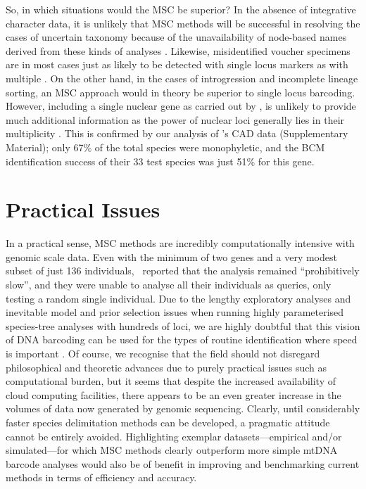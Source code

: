 \documentclass[12pt]{article}
\begin{document}
So, in which situations would the MSC be superior? In the absence of integrative character data, it is unlikely that MSC methods will be successful in resolving the cases of uncertain taxonomy because of the unavailability of node-based names derived from these kinds of analyses \citep{Bauer2010}. Likewise, misidentified voucher specimens are in most cases just as likely to be detected with single locus markers as with multiple \citep{Becker2011,Ko2013}. On the other hand, in the cases of introgression and incomplete lineage sorting, an MSC approach would in theory be superior to single locus barcoding. However, including a single nuclear gene as carried out by \citeauthor{Dowton2014}, is unlikely to provide much additional information as the power of nuclear loci generally lies in their multiplicity \citep{Edwards2009}. This is confirmed by our analysis of \citeauthor{Dowton2014}'s CAD data (Supplementary Material); only 67\% of the total species were monophyletic, and the BCM identification success of their 33 test species was just 51\% for this gene. 

\section*{Practical Issues}

In a practical sense, MSC methods are incredibly computationally intensive with genomic scale data. Even with the minimum of two genes and a very modest subset of just 136 individuals, \citeauthor{Dowton2014}\ reported that the analysis remained ``prohibitively slow'', and they were unable to analyse all their individuals as queries, only testing a random single individual. Due to the lengthy exploratory analyses and inevitable model and prior selection issues when running highly parameterised species-tree analyses with hundreds of loci, we are highly doubtful that this vision of DNA barcoding can be used for the types of routine identification where speed is important \citep{Armstrong2005}. Of course, we recognise that the field should not disregard philosophical and theoretic advances due to purely practical issues such as computational burden, but it seems that despite the increased availability of cloud computing facilities, there appears to be an even greater increase in the volumes of data now generated by genomic sequencing. Clearly, until considerably faster species delimitation methods can be developed, a pragmatic attitude cannot be entirely avoided.  Highlighting exemplar datasets---empirical and/or simulated---for which MSC methods clearly outperform more simple mtDNA barcode analyses would also be of benefit in improving and benchmarking current methods in terms of efficiency and accuracy.
\end{document}
